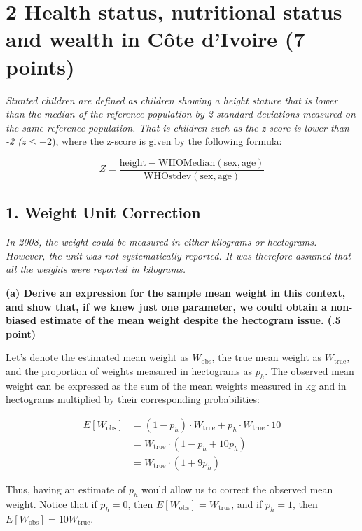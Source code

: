 \documentclass[
  letterpaper,
  DIV=11,
  numbers=noendperiod]{scrartcl}
\begin{document}
\section{2 Health status, nutritional status and wealth in Côte d'Ivoire
(7
points)}\label{health-status-nutritional-status-and-wealth-in-cuxf4te-divoire-7-points}

\emph{Stunted children are defined as children showing a height stature
that is lower than the median of the reference population by 2 standard
deviations measured on the same reference population. That is children
such as the z-score is lower than -2 (}\(z \le -2\)), where the z-score
is given by the following formula:

\[Z = \frac{\text{height} - \text{WHOMedian}(\text{sex}, \text{age})}{\text{WHOstdev}(\text{sex}, \text{age})}\]

\subsection{1. Weight Unit Correction}\label{weight-unit-correction}

\emph{In 2008, the weight could be measured in either kilograms or
hectograms. However, the unit was not systematically reported. It was
therefore assumed that all the weights were reported in kilograms.}

\textbf{(a) Derive an expression for the sample mean weight in this
context, and show that, if we knew just one parameter, we could obtain a
non-biased estimate of the mean weight despite the hectogram issue. (.5
point)}

Let's denote the estimated mean weight as \(W_{\text{obs}}\), the true
mean weight as \(W_{\text{true}}\), and the proportion of weights
measured in hectograms as \(p_h\). The observed mean weight can be
expressed as the sum of the mean weights measured in kg and in
hectograms multiplied by their corresponding probabilities:

\[
\begin{aligned}
E[W_{\text{obs}}] &= (1 - p_h) \cdot W_{\text{true}} + p_h \cdot W_{\text{true}}\cdot 10\\
  &= W_{\text{true}} \cdot (1 - p_h + 10 p_h)\\
  &= W_{\text{true}} \cdot (1 + 9 p_h)
\end{aligned}
\]

Thus, having an estimate of \(p_h\) would allow us to correct the
observed mean weight. Notice that if \(p_h = 0\), then
\(E[W_{\text{obs}}] = W_{\text{true}}\), and if \(p_h = 1\), then
\(E[W_{\text{obs}}] = 10 W_{\text{true}}\).
\end{document}
